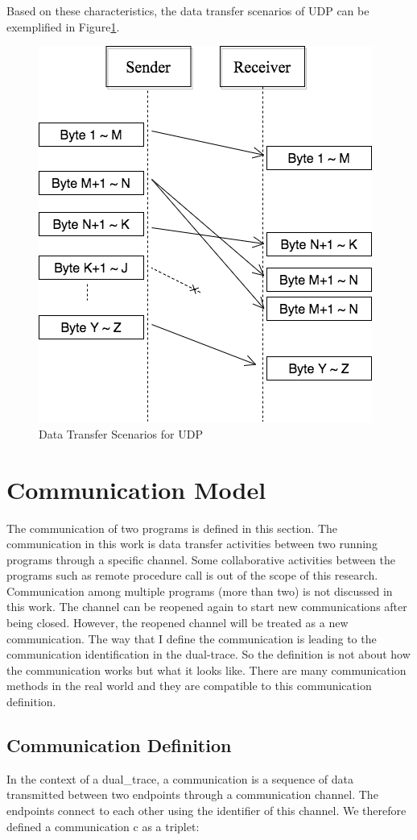 Based on these characteristics, the data transfer scenarios of UDP can be exemplified in Figure\ref{upd}.
\begin{figure}[H]
\centerline{\includegraphics[scale=0.48]{Figures/udp}}
 \caption{Data Transfer Scenarios for UDP}
\label{upd}
\end{figure}

\section{Communication Model}\label{definition}
The communication of two programs is defined in this section. The communication in this work is data transfer activities between two running programs through a specific channel. Some collaborative activities between the programs such as remote procedure call is out of the scope of this research. Communication among multiple programs (more than two) is not discussed in this work. The channel can be reopened again to start new communications after being closed. However, the reopened channel will be treated as a new communication. The way that I define the communication is leading to the communication identification in the dual-trace. So the definition is not about how the communication works but what it looks like. There are many communication methods in the real world and they are compatible to this communication definition. 

\subsection{Communication Definition}
In the context of a dual\_trace, a communication is a sequence of data transmitted between two endpoints through a communication channel. The endpoints connect to each other using the identifier of this channel. We therefore defined a communication c as a triplet:


